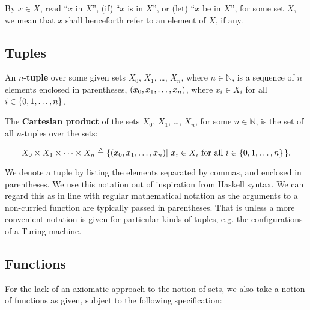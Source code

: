 \begin{notation} By $x\in X$, read ``$x$ in $X$'', (if) ``$x$ is in $X$'', or
(let) ``$x$ be in $X$'',  for some set $X$, we mean that $x$ shall henceforth
refer to an element of $X$, if any. \end{notation}


\subsection{Tuples}

\begin{definition} An $n$-\textbf{tuple} over some given sets $X_0$, $X_1$,
\ldots, $X_n$, where $n\in\mathbb{N}$, is a sequence of $n$ elements enclosed
in parentheses, $\mathopen{}\left({x_0,x_1,\ldots,x_n}\right)\mathclose{}$, where $x_i\in X_i$ for all
$i\in\mathopen{}\left\{{0,1,\ldots, n}\right\}\mathclose{}$. \end{definition}

\begin{definition} The \textbf{Cartesian product} of the sets $X_0$, $X_1$,
\ldots, $X_n$, for some $n\in\mathbb{N}$, is the set of all $n$-tuples over the
sets:

$$X_0\times X_1\times \cdots \times X_n \triangleq
\mathopen{}\left\{{\mathopen{}\left({x_0,x_1,\ldots,x_n}\right)\mathclose{}\mathopen{}\left|\ { \text{$x_i\in X_i$ for all
$i\in\mathopen{}\left\{{0,1,\ldots, n}\right\}\mathclose{}$}}\right.\mathclose{}}\right\}\mathclose{}.$$

\end{definition}

\begin{notation} We denote a tuple by listing the elements separated by commas,
and enclosed in parentheses. We use this notation out of inspiration from
Haskell syntax. We can regard this as in line with regular mathematical
notation as the arguments to a non-curried function are typically passed in
parentheses. That is unless a more convenient notation is given for particular
kinds of tuples, e.g. the configurations of a Turing machine.\end{notation}

\subsection{Functions}

For the lack of an axiomatic approach to the notion of sets, we also take a
notion of functions as given, subject to the following specification:

